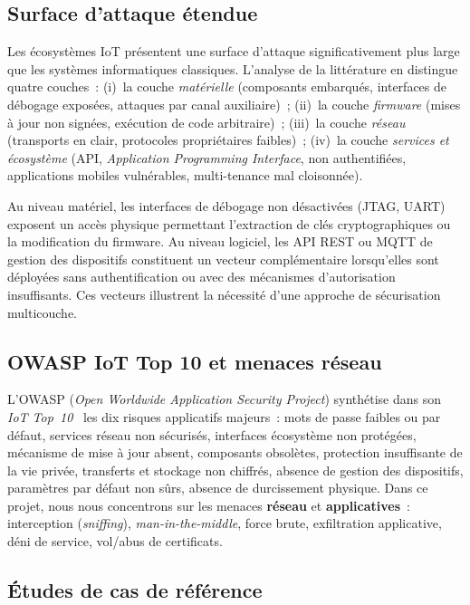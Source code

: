\subsection{Surface d'attaque étendue}

Les écosystèmes IoT présentent une surface d'attaque significativement plus large que les systèmes informatiques classiques. L'analyse de la littérature en distingue quatre couches~: (i)~la couche \emph{matérielle} (composants embarqués, interfaces de débogage exposées, attaques par canal auxiliaire)~; (ii)~la couche \emph{firmware} (mises à jour non signées, exécution de code arbitraire)~; (iii)~la couche \emph{réseau} (transports en clair, protocoles propriétaires faibles)~; (iv)~la couche \emph{services et écosystème} (API, \emph{Application Programming Interface}, non authentifiées, applications mobiles vulnérables, multi-tenance mal cloisonnée).

Au niveau matériel, les interfaces de débogage non désactivées (JTAG, UART) exposent un accès physique permettant l'extraction de clés cryptographiques ou la modification du firmware. Au niveau logiciel, les API REST ou MQTT de gestion des dispositifs constituent un vecteur complémentaire lorsqu'elles sont déployées sans authentification ou avec des mécanismes d'autorisation insuffisants. Ces vecteurs illustrent la nécessité d'une approche de sécurisation multicouche.

\subsection{OWASP IoT Top 10 et menaces réseau}

L'OWASP (\emph{Open Worldwide Application Security Project}) synthétise dans son \emph{IoT Top~10}~\cite{owasp_iot} les dix risques applicatifs majeurs~: mots de passe faibles ou par défaut, services réseau non sécurisés, interfaces écosystème non protégées, mécanisme de mise à jour absent, composants obsolètes, protection insuffisante de la vie privée, transferts et stockage non chiffrés, absence de gestion des dispositifs, paramètres par défaut non sûrs, absence de durcissement physique. Dans ce projet, nous nous concentrons sur les menaces \textbf{réseau} et \textbf{applicatives}~: interception (\emph{sniffing}), \emph{man-in-the-middle}, force brute, exfiltration applicative, déni de service, vol/abus de certificats.

\subsection{Études de cas de référence}


